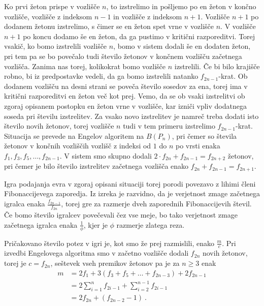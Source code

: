 \documentclass[twoside,11pt]{article}
\begin{document}
\begin{dokaz}
\begin{itemize}
    Ko prvi žeton prispe v vozlišče $n$, to izstrelimo in pošljemo po en žeton v končno vozlišče, vozlišče z indeksom $n-1$ in vozlišče z indeksom $n+1$. Vozlišče $n+1$ po dodanem žetonu izstrelimo, s čimer se en žeton spet vrne v vozlišče $n$.
    V vozlišče $n+1$ po koncu dodamo še en žeton, da ga pustimo v kritični razporeditvi. Torej vsakič, ko bomo izstrelili vozlišče $n$, bomo v sistem dodali še en dodaten žeton, pri tem pa se bo povečalo tudi število žetonov v končnem vozlišču začetnega vozlišča.
    Zanima nas torej, kolikokrat bomo vozlišče $n$ izstrelili. Če bi bilo krajišče robno, bi iz predpostavke vedeli, da ga bomo izstrelili natanko $f_{2n-1}$-krat. Ob dodanem vozlišču na desni strani se poveča število sosedov za ena, torej ima v kritični razporeditvi en žeton več kot prej.
    Vemo, da se ob vsaki izstrelitvi ob zgoraj opisanem postopku en žeton vrne v vozlišče, kar izniči vpliv dodatnega soseda pri številu izstrelitev. Za vsako novo izstrelitev je namreč treba dodati isto število novih žetonov, torej vozlišče $n$ tudi v tem primeru izstrelimo $f_{2n-1}$-krat.
    Situacija se prevede na Engelov algoritem na $B(P_n)$, pri čemer so števila žetonov v končnih vozliščih vozlišč z indeksi od $1$ do $n$ po vrsti enaka $f_1,f_3,f_5,\ldots,f_{2n-1}$. V sistem smo skupno dodali $2\cdot f_{2n}+ f_{2n-1} = f_{2n+2}$ žetonov, pri čemer je bilo število
    izstrelitev začetnega vozlišča enako $f_{2n}+f_{2n-1}=f_{2n+1}$.
    
    

\end{itemize}
\hfill \QED

 
    
\end{dokaz}

Igra podajanja evra v zgoraj opisani situaciji torej porodi povezavo z lihimi členi Fibonaccijevega zaporedja. Iz izreka je razvidno, da je verjetnost zmage začetnega igralca enaka $\frac{f_{2n-1}}{f_{2n}}$, torej gre za razmerje dveh zaporednih Fibonaccijevih števil. Če bomo število igralcev povečevali čez vse meje,
bo tako verjetnost zmage začetnega igralca enaka $\frac{1}{\phi}$, kjer je $\phi$ razmerje zlatega reza.

Pričakovano število potez v igri je, kot smo že prej razmislili, enako $\frac{m}{c}$. Pri izvedbi Engelovega algoritma smo v začetno vozlišče dodali $f_{2n}$ novih žetonov, torej je $c=f_{2n}$, seštevek vseh premikov žetonov pa je za $n \ge 3$ enak
\begin{align*}
    m &= 2f_1+3(f_3+f_5+\ldots+f_{2n-3}) + 2f_{2n-1} \\
    &=2\sum_{i=1}^{n}f_{2i-1} + \sum_{i=2}^{n-1}f_{2i-1} \\
    &=2f_{2n} + (f_{2n-2}-1) \ .
\end{align*}
\end{document}
